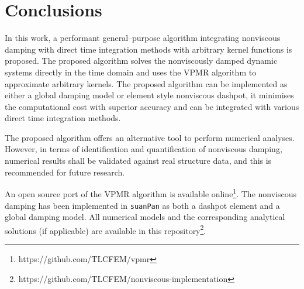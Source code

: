 \section{Conclusions}
In this work, a performant general--purpose algorithm integrating nonviscous damping with direct time integration methods with arbitrary kernel functions is proposed.
The proposed algorithm solves the nonviscously damped dynamic systems directly in the time domain and uses the VPMR algorithm to approximate arbitrary kernels.
The proposed algorithm can be implemented as either a global damping model or element style nonviscous dashpot, it minimises the computational cost with superior accuracy and can be integrated with various direct time integration methods.

The proposed algorithm offers an alternative tool to perform numerical analyses. However, in terms of identification and quantification of nonviscous damping, numerical results shall be validated against real structure data, and this is recommended for future research.

An open source port of the VPMR algorithm is available online\footnote{https://github.com/TLCFEM/vpmr}.
The nonviscous damping has been implemented in \texttt{suanPan} \citep{Chang2023} as both a dashpot element and a global damping model. All numerical models and the corresponding analytical solutions (if applicable) are available in this repository\footnote{https://github.com/TLCFEM/nonviscous-implementation}.